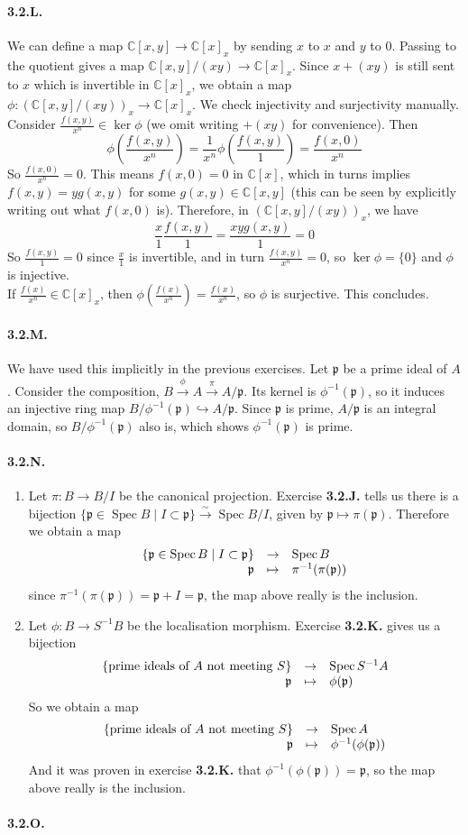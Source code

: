\documentclass{article}
\newcommand{\C}{\mathbb{C}}
\DeclareMathOperator{\Spec}{Spec}
\newcommand{\applic}[4]{\begin{array}[t]{rcl}
#1 & \to & #2 \\
#3 & \mapsto & #4
\end{array}}
\newcommand{\p}{\mathfrak{p}}
\begin{document}
\paragraph{3.2.L.} We can define a map $\C[x,y] \to \C[x]_x$ by sending $x$ to $x$ and $y$ to $0$. Passing to the quotient gives a map $\C[x,y]/(xy) \to \C[x]_x$. Since $x + (xy)$ is still sent to $x$ which is invertible in $\C[x]_x$, we obtain a map $\phi : (\C[x,y]/(xy))_x \to \C[x]_x$. We check injectivity and surjectivity manually. Consider $\frac{f(x,y)}{x^n} \in \ker \phi$ (we omit writing $+(xy)$ for convenience). Then
\[\phi \left(\frac{f(x,y)}{x^n}\right) = \frac{1}{x^n} \phi \left(\frac{f(x,y)}{1}\right) = \frac{f(x,0)}{x^n}\]
So $\frac{f(x,0)}{x^n} = 0$. This means $f(x,0) = 0$ in $\C[x]$, which in turns implies $f(x,y) = yg(x,y)$ for some $g(x,y) \in \C[x,y]$ (this can be seen by explicitly writing out what $f(x,0)$ is). Therefore, in $(\C[x,y]/(xy))_x$, we have
\[\frac{x}{1} \frac{f(x,y)}{1} = \frac{xyg(x,y)}{1} = 0\]
So $\frac{f(x,y)}{1} = 0$ since $\frac{x}{1}$ is invertible, and in turn $\frac{f(x,y)}{x^n} = 0$, so $\ker \phi = \{0\}$ and $\phi$ is injective. \\
If $\frac{f(x)}{x^n} \in \C[x]_x$, then $\phi(\frac{f(x)}{x^n}) = \frac{f(x)}{x^n}$, so $\phi$ is surjective. This concludes.

\paragraph{3.2.M.} We have used this implicitly in the previous exercises. Let $\p$ be a prime ideal of $A$. Consider the composition, $B \xrightarrow{\phi} A \xrightarrow{\pi} A/\p$. Its kernel is $\phi^{-1}(\p)$, so it induces an injective ring map $B/\phi^{-1}(\p) \hookrightarrow A/\p$. Since $\p$ is prime, $A/\p$ is an integral domain, so $B/\phi^{-1}(\p)$ also is, which shows $\phi^{-1}(\p)$ is prime.

\paragraph{3.2.N.} \begin{enumerate}
    \item Let $\pi : B \to B/I$ be the canonical projection. Exercise \textbf{3.2.J.} tells us there is a bijection $\{\p \in \Spec B \mid I \subset \p\} \xrightarrow{\sim} \Spec B/I$, given by $\p \mapsto \pi(\p)$. Therefore we obtain a map
    \[\applic{\{\p \in \Spec B \mid I \subset \p\}}{\Spec B}{\p}{\pi^{-1}(\pi(\p))}\]
    since $\pi^{-1}(\pi(\p)) = \p + I = \p$, the map above really is the inclusion.
    \item Let $\phi : B \to S^{-1}B$ be the localisation morphism. Exercise \textbf{3.2.K.} gives us a bijection
    \[\applic{\{\text{prime ideals of $A$ not meeting $S$}\}}{\Spec S^{-1}A}{\p}{\phi (\p)}\]
    So we obtain a map
    \[\applic{\{\text{prime ideals of $A$ not meeting $S$}\}}{\Spec A}{\p}{\phi^{-1}(\phi (\p))}\]
    And it was proven in exercise \textbf{3.2.K.} that $\phi^{-1}(\phi (\p)) = \p$, so the map above really is the inclusion.
\end{enumerate}

\paragraph{3.2.O.} 
\end{document}
